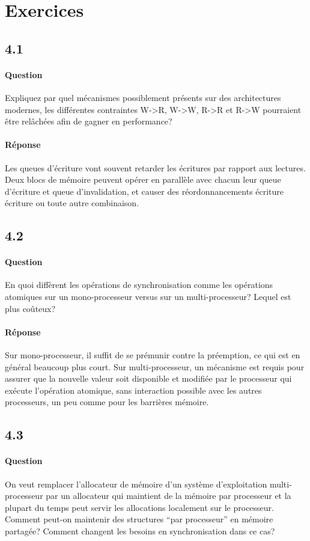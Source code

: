 \documentclass[oneside]{book}
\begin{document}
\section{Exercices}
\subsection{4.1}
\paragraph{Question}
Expliquez par quel mécanismes possiblement présents sur des architectures
modernes, les différentes contraintes W->R, W->W, R->R et R->W pourraient être
relâchées afin de gagner en performance?
\paragraph{Réponse}
Les queues d'écriture vont souvent retarder les écritures par rapport aux
lectures. Deux blocs de mémoire peuvent opérer en parallèle avec chacun leur
queue d'écriture et queue d'invalidation, et causer des réordonnancements
écriture écriture ou toute autre combinaison.
\subsection{4.2}
\paragraph{Question}
En quoi diffèrent les opérations de synchronisation comme les opérations
atomiques sur un mono-processeur versus sur un multi-processeur? Lequel est
plus coûteux?
\paragraph{Réponse}
Sur mono-processeur, il suffit de se prémunir contre la préemption, ce qui est en
général beaucoup plus court. Sur multi-processeur, un mécanisme est requis
pour assurer que la nouvelle valeur soit disponible et modifiée par le processeur
qui exécute l'opération atomique, sans interaction possible avec les autres
processeurs, un peu comme pour les barrières mémoire.
\subsection{4.3}
\paragraph{Question}
On veut remplacer l'allocateur de mémoire d'un système d'exploitation multi-
processeur par un allocateur qui maintient de la mémoire par processeur et la
plupart du temps peut servir les allocations localement sur le processeur.
Comment peut-on maintenir des structures “par processeur” en mémoire
partagée? Comment changent les besoins en synchronisation dans ce cas?
\end{document}
